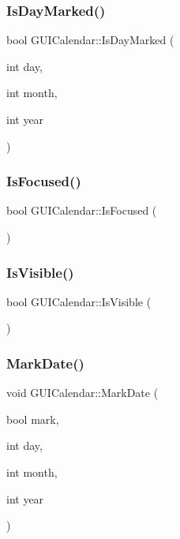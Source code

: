 \subsubsection{\texorpdfstring{Is\+Day\+Marked()}{IsDayMarked()}}
{\footnotesize\ttfamily bool G\+U\+I\+Calendar\+::\+Is\+Day\+Marked (\begin{DoxyParamCaption}\item[{int}]{day,  }\item[{int}]{month,  }\item[{int}]{year }\end{DoxyParamCaption})}

\hypertarget{class_g_u_i_calendar_aeba95b85a6b35c8cf6ebbede984719d4}{}\label{class_g_u_i_calendar_aeba95b85a6b35c8cf6ebbede984719d4} 
\subsubsection{\texorpdfstring{Is\+Focused()}{IsFocused()}}
{\footnotesize\ttfamily bool G\+U\+I\+Calendar\+::\+Is\+Focused (\begin{DoxyParamCaption}{ }\end{DoxyParamCaption})}

\hypertarget{class_g_u_i_calendar_a9788a8c732119ae1581606ce7b594c69}{}\label{class_g_u_i_calendar_a9788a8c732119ae1581606ce7b594c69} 
\subsubsection{\texorpdfstring{Is\+Visible()}{IsVisible()}}
{\footnotesize\ttfamily bool G\+U\+I\+Calendar\+::\+Is\+Visible (\begin{DoxyParamCaption}{ }\end{DoxyParamCaption})}

\hypertarget{class_g_u_i_calendar_a3faf495cbcc49dc23758f3d12ffadf94}{}\label{class_g_u_i_calendar_a3faf495cbcc49dc23758f3d12ffadf94} 
\subsubsection{\texorpdfstring{Mark\+Date()}{MarkDate()}}
{\footnotesize\ttfamily void G\+U\+I\+Calendar\+::\+Mark\+Date (\begin{DoxyParamCaption}\item[{bool}]{mark,  }\item[{int}]{day,  }\item[{int}]{month,  }\item[{int}]{year }\end{DoxyParamCaption})}

